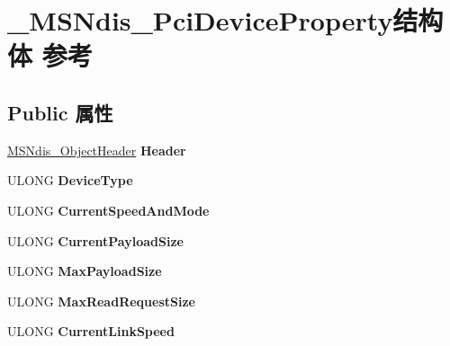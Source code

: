 \hypertarget{struct___m_s_ndis___pci_device_property}{}\section{\+\_\+\+M\+S\+Ndis\+\_\+\+Pci\+Device\+Property结构体 参考}
\label{struct___m_s_ndis___pci_device_property}
\subsection*{Public 属性}
\begin{DoxyCompactItemize}
\item 
\mbox{\label{struct___m_s_ndis___pci_device_property_aa9922a8e89b48455efe8e77808730133}} 
\hyperlink{struct___m_s_ndis___object_header}{M\+S\+Ndis\+\_\+\+Object\+Header} {\bfseries Header}
\item 
\mbox{\label{struct___m_s_ndis___pci_device_property_a707a8c5b20e32d95eb037867896e8fb2}} 
U\+L\+O\+NG {\bfseries Device\+Type}
\item 
\mbox{\label{struct___m_s_ndis___pci_device_property_a720b474dee2f5d0026ecf4e692267ab3}} 
U\+L\+O\+NG {\bfseries Current\+Speed\+And\+Mode}
\item 
\mbox{\label{struct___m_s_ndis___pci_device_property_a83241fd66036d8110a7656875a8e67d8}} 
U\+L\+O\+NG {\bfseries Current\+Payload\+Size}
\item 
\mbox{\label{struct___m_s_ndis___pci_device_property_af0fe4be881000c73af40e33b35e52123}} 
U\+L\+O\+NG {\bfseries Max\+Payload\+Size}
\item 
\mbox{\label{struct___m_s_ndis___pci_device_property_af89dabbe7239681044a37a1b9d21daf9}} 
U\+L\+O\+NG {\bfseries Max\+Read\+Request\+Size}
\item 
\mbox{\label{struct___m_s_ndis___pci_device_property_a13a087c6fc23b245371c88cc54f8db7b}} 
U\+L\+O\+NG {\bfseries Current\+Link\+Speed}

\end{DoxyCompactItemize}
